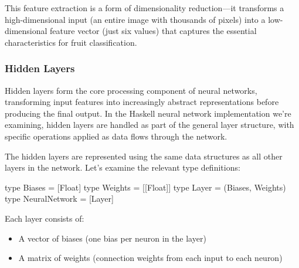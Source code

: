 \documentclass[12pt,a4paper]{article}
\begin{document}
This feature extraction is a form of dimensionality reduction---it transforms a high-dimensional input (an entire image with thousands of pixels) into a low-dimensional feature vector (just six values) that captures the essential characteristics for fruit classification.

\subsubsection{Hidden Layers}
Hidden layers form the core processing component of neural networks, transforming input features into increasingly abstract representations before producing the final output. In the Haskell neural network implementation we're examining, hidden layers are handled as part of the general layer structure, with specific operations applied as data flows through the network.

The hidden layers are represented using the same data structures as all other layers in the network. Let's examine the relevant type definitions:
\begin{code}
type Biases = [Float]
type Weights = [[Float]]
type Layer = (Biases, Weights)
type NeuralNetwork = [Layer]
\end{code}
Each layer consists of:
\begin{itemize}
\item A vector of biases (one bias per neuron in the layer)
\item A matrix of weights (connection weights from each input to each neuron)
\end{itemize}
\end{document}
